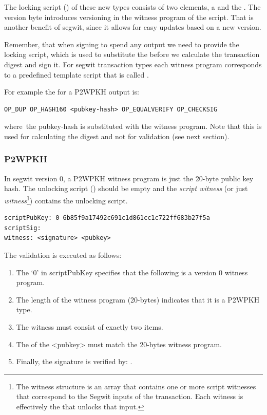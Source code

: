 The locking script () of these new types consists of two elements, a  and the . The version byte introduces versioning in the witness program of the script. That is another benefit of segwit, since it allows for easy updates based on a new version.

Remember, that when signing to spend any output we need to provide the locking script, which is used to substitute the  before we calculate the transaction digest and sign it. For segwit transaction types each witness program corresponds to a predefined template script that is called .

For example the  for a P2WPKH output is:

\begin{emphbox}
\begin{lstlisting}[style=Pseudomath]
OP_DUP OP_HASH160 <pubkey-hash> OP_EQUALVERIFY OP_CHECKSIG
\end{lstlisting}
\end{emphbox}

where the pubkey-hash is substituted with the witness program. Note that this is used for calculating the digest and not for validation (see next section).

\subsubsection*{P2WPKH}
In segwit version 0, a P2WPKH witness program is just the 20-byte public key hash. The unlocking script () should be empty and the \emph{script witness} (or just \emph{witness}\footnote{The witness structure is an array that contains one or more script witnesses that correspond to the Segwit inputs of the transaction. Each witness is effectively the  that unlocks that input.}) contains the unlocking script.

\begin{emphbox}
\begin{lstlisting}[style=Pseudomath]
scriptPubKey: 0 6b85f9a17492c691c1d861cc1c722ff683b27f5a
scriptSig:
witness: <signature> <pubkey>
\end{lstlisting}
\end{emphbox}

The validation is executed as follows:
\begin{enumerate}
\item The `0' in scriptPubKey specifies that the following is a version 0 witness program.
\item The length of the witness program (20-bytes) indicates that it is a P2WPKH type.
\item The witness must consist of exactly two items.
\item The  of the <pubkey> must match the 20-bytes witness program.
\item Finally, the signature is verified by: .
\end{enumerate}


